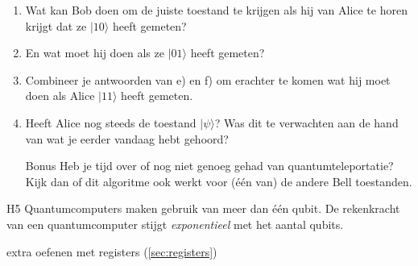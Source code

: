 \documentclass[../../main.tex]{subfiles}
\begin{document}
\begin{antwoord}
\end{antwoord}
\begin{opdracht}
\begin{enumerate}
\item Wat kan Bob doen om de juiste toestand te krijgen als hij van Alice te horen krijgt dat ze $|10\rangle$ heeft gemeten?
\item En wat moet hij doen als ze $|01\rangle$ heeft gemeten?
\item Combineer je antwoorden van e) en f) om erachter te komen wat hij moet doen als Alice $|11\rangle$ heeft gemeten.
\item Heeft Alice nog steeds de toestand $|\psi\rangle$? Was dit te verwachten aan de hand van wat je eerder vandaag hebt gehoord?
\item [Bonus] Heb je tijd over of nog niet genoeg gehad van quantumteleportatie? Kijk dan of dit algoritme ook werkt voor (\'e\'en van) de andere Bell toestanden.
\end{enumerate}
\end{opdracht}


H5
 Quantumcomputers maken gebruik van meer dan \'e\'en qubit. De rekenkracht van een quantumcomputer stijgt \textit{exponentieel} met het aantal qubits.

extra oefenen met registers (\ref{sec:registers})
\end{document}

